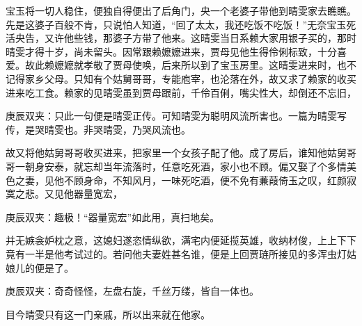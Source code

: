 \begin{parag}
    宝玉将一切人稳住，便独自得便出了后角门，央一个老婆子带他到晴雯家去瞧瞧。先是这婆子百般不肯，只说怕人知道，“回了太太，我还吃饭不吃饭！”无奈宝玉死活央告，又许他些钱，那婆子方带了他来。这晴雯当日系赖大家用银子买的，那时晴雯才得十岁，尚未留头。因常跟赖嬷嬷进来，贾母见他生得伶俐标致，十分喜爱。故此赖嬷嬷就孝敬了贾母使唤，后来所以到了宝玉房里。这晴雯进来时，也不记得家乡父母。只知有个姑舅哥哥，专能庖宰，也沦落在外，故又求了赖家的收买进来吃工食。赖家的见晴雯虽到贾母跟前，千伶百俐，嘴尖性大，却倒还不忘旧，\begin{note}庚辰双夹：只此一句便是晴雯正传。可知晴雯为聪明风流所害也。一篇为晴雯写传，是哭晴雯也。非哭晴雯，乃哭风流也。\end{note}故又将他姑舅哥哥收买进来，把家里一个女孩子配了他。成了房后，谁知他姑舅哥哥一朝身安泰，就忘却当年流落时，任意吃死酒，家小也不顾。偏又娶了个多情美色之妻，见他不顾身命，不知风月，一味死吃酒，便不免有蒹葭倚玉之叹，红颜寂寞之悲。又见他器量宽宏，\begin{note}庚辰双夹：趣极！“器量宽宏”如此用，真扫地矣。\end{note}并无嫉衾妒枕之意，这媳妇遂恣情纵欲，满宅内便延揽英雄，收纳材俊，上上下下竟有一半是他考试过的。若问他夫妻姓甚名谁，便是上回贾琏所接见的多浑虫灯姑娘儿的便是了。\begin{note}庚辰双夹：奇奇怪怪，左盘右旋，千丝万缕，皆自一体也。\end{note}目今晴雯只有这一门亲戚，所以出来就在他家。
\end{parag}



